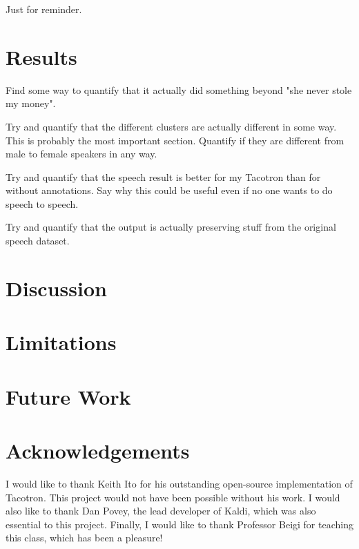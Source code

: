 \documentclass{article}
\begin{document}
Just for reminder.


\section{Results}
\label{sec:results}

Find some way to quantify that it actually did something beyond "she never stole my money".

Try and quantify that the different clusters are actually different in some way. This is probably the most important section. Quantify if they are different from male to female speakers in any way.

Try and quantify that the speech result is better for my Tacotron than for without annotations. Say why this could be useful even if no one wants to do speech to speech.

Try and quantify that the output is actually preserving stuff from the original speech dataset.

\section{Discussion}

\section{Limitations}

\section{Future Work}

\section{Acknowledgements}
\label{sec:acknowledgements}
I would like to thank Keith Ito for his outstanding open-source implementation of Tacotron. This project would not have been possible without his work. I would also like to thank Dan Povey, the lead developer of Kaldi, which was also essential to this project. Finally, I would like to thank Professor Beigi for teaching this class, which has been a pleasure!
\end{document}
